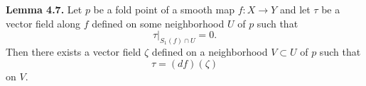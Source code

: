 {\textbf{Lemma 4.7.}} Let $p$ be a fold point of a smooth map $f: X \rightarrow Y$ and let $\tau$ be a vector field along $f$ defined on some neighborhood $U$ of $p$ such that
$$\tau \big|_{S_1(f) \cap U} = 0.$$
Then there exists a vector field $\zeta$ defined on a neighborhood $V \subset U$ of $p$ such that
$$\tau = (df)(\zeta)$$
on $V$.
